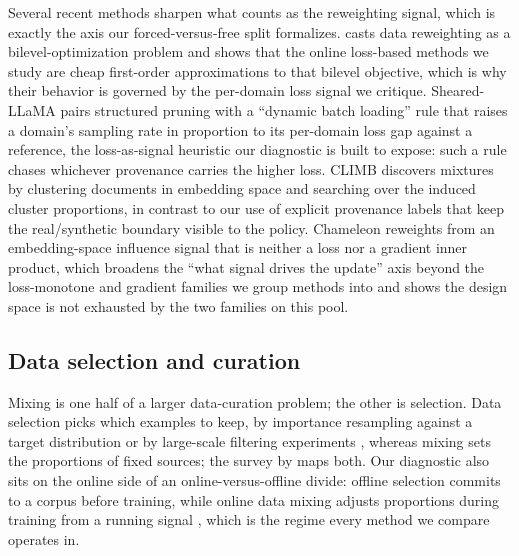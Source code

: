 \documentclass{article}
\begin{document}
Several recent methods sharpen what counts as the reweighting signal, which is exactly the axis our forced-versus-free split formalizes. \citet{scalebio2025} casts data reweighting as a bilevel-optimization problem and shows that the online loss-based methods we study are cheap first-order approximations to that bilevel objective, which is why their behavior is governed by the per-domain loss signal we critique. Sheared-LLaMA \citep{shearedllama2024} pairs structured pruning with a ``dynamic batch loading'' rule that raises a domain's sampling rate in proportion to its per-domain loss gap against a reference, the loss-as-signal heuristic our diagnostic is built to expose: such a rule chases whichever provenance carries the higher loss. CLIMB \citep{climb2025} discovers mixtures by clustering documents in embedding space and searching over the induced cluster proportions, in contrast to our use of explicit provenance labels that keep the real/synthetic boundary visible to the policy. Chameleon \citep{chameleon2025} reweights from an embedding-space influence signal that is neither a loss nor a gradient inner product, which broadens the ``what signal drives the update'' axis beyond the loss-monotone and gradient families we group methods into and shows the design space is not exhausted by the two families on this pool.

\subsection{Data selection and curation}

Mixing is one half of a larger data-curation problem; the other is selection. Data selection picks which examples to keep, by importance resampling against a target distribution \citep{xie2023dsir} or by large-scale filtering experiments \citep{li2024dclm}, whereas mixing sets the proportions of fixed sources; the survey by \citet{albalak2024survey} maps both. Our diagnostic also sits on the online side of an online-versus-offline divide: offline selection commits to a corpus before training, while online data mixing adjusts proportions during training from a running signal \citep{albalak2023odm, velocitune2025}, which is the regime every method we compare operates in.
\end{document}
